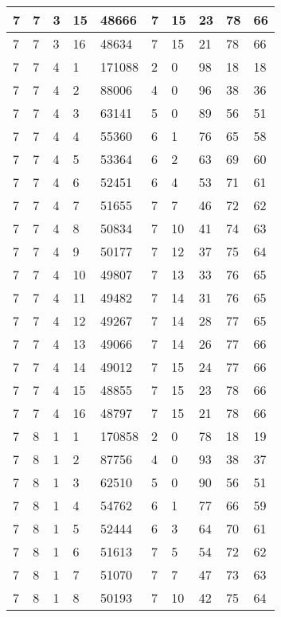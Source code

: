 \begin{table}[!ht]
\begin{tabular}{|l|l|l|l|l|l|l|l|l|l|}
        7 & 7 & 3 & 15 & 48666 & 7 & 15 & 23 & 78 & 66 \\ \hline
        7 & 7 & 3 & 16 & 48634 & 7 & 15 & 21 & 78 & 66 \\ \hline
        7 & 7 & 4 & 1 & 171088 & 2 & 0 & 98 & 18 & 18 \\ \hline
        7 & 7 & 4 & 2 & 88006 & 4 & 0 & 96 & 38 & 36 \\ \hline
        7 & 7 & 4 & 3 & 63141 & 5 & 0 & 89 & 56 & 51 \\ \hline
        7 & 7 & 4 & 4 & 55360 & 6 & 1 & 76 & 65 & 58 \\ \hline
        7 & 7 & 4 & 5 & 53364 & 6 & 2 & 63 & 69 & 60 \\ \hline
        7 & 7 & 4 & 6 & 52451 & 6 & 4 & 53 & 71 & 61 \\ \hline
        7 & 7 & 4 & 7 & 51655 & 7 & 7 & 46 & 72 & 62 \\ \hline
        7 & 7 & 4 & 8 & 50834 & 7 & 10 & 41 & 74 & 63 \\ \hline
        7 & 7 & 4 & 9 & 50177 & 7 & 12 & 37 & 75 & 64 \\ \hline
        7 & 7 & 4 & 10 & 49807 & 7 & 13 & 33 & 76 & 65 \\ \hline
        7 & 7 & 4 & 11 & 49482 & 7 & 14 & 31 & 76 & 65 \\ \hline
        7 & 7 & 4 & 12 & 49267 & 7 & 14 & 28 & 77 & 65 \\ \hline
        7 & 7 & 4 & 13 & 49066 & 7 & 14 & 26 & 77 & 66 \\ \hline
        7 & 7 & 4 & 14 & 49012 & 7 & 15 & 24 & 77 & 66 \\ \hline
        7 & 7 & 4 & 15 & 48855 & 7 & 15 & 23 & 78 & 66 \\ \hline
        7 & 7 & 4 & 16 & 48797 & 7 & 15 & 21 & 78 & 66 \\ \hline
        7 & 8 & 1 & 1 & 170858 & 2 & 0 & 78 & 18 & 19 \\ \hline
        7 & 8 & 1 & 2 & 87756 & 4 & 0 & 93 & 38 & 37 \\ \hline
        7 & 8 & 1 & 3 & 62510 & 5 & 0 & 90 & 56 & 51 \\ \hline
        7 & 8 & 1 & 4 & 54762 & 6 & 1 & 77 & 66 & 59 \\ \hline
        7 & 8 & 1 & 5 & 52444 & 6 & 3 & 64 & 70 & 61 \\ \hline
        7 & 8 & 1 & 6 & 51613 & 7 & 5 & 54 & 72 & 62 \\ \hline
        7 & 8 & 1 & 7 & 51070 & 7 & 7 & 47 & 73 & 63 \\ \hline
        7 & 8 & 1 & 8 & 50193 & 7 & 10 & 42 & 75 & 64 \\ \hline

\end{tabular}
\end{table}

